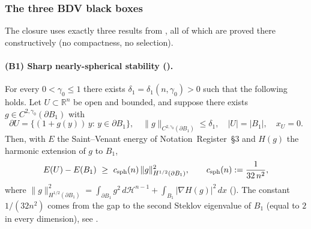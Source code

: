 \subsubsection{The three BDV black boxes}
\label{sec:plan1-bdv-blackboxes}

The closure uses exactly three results from
\cite{BDV}, all of which are proved there constructively (no
compactness, no selection).

\paragraph{(B1) Sharp nearly-spherical stability \textnormal{(\cite[Theorem~3.3]{BDV})}.}
For every $0<\gamma_{0}\le 1$ there exists
$\delta_{1}=\delta_{1}(n,\gamma_{0})>0$ such that the following holds.
Let $U\subset\mathbb{R}^{n}$ be open and bounded, and suppose there
exists $g\in C^{2,\gamma_{0}}(\partial B_{1})$ with
\begin{equation}\label{eq:plan1-ns-hyp}
   \partial U=\bigl\{(1+g(y))\,y:\,y\in\partial B_{1}\bigr\},
   \quad
   \|g\|_{C^{2,\gamma_{0}}(\partial B_{1})}\le\delta_{1},
   \quad
   |U|=|B_{1}|,
   \quad
   x_{U}=0.
\end{equation}
Then, with $E$ the Saint--Venant energy of
Notation~Register~\S3 and $H(g)$ the harmonic extension of $g$ to
$B_{1}$,
\begin{equation}\label{eq:plan1-BDV33}
   E(U)-E(B_{1})\ \ge\
   c_{\rm sph}(n)\,\|g\|_{H^{1/2}(\partial B_{1})}^{2},
   \qquad
   c_{\rm sph}(n):=\frac{1}{32\,n^{2}},
\end{equation}
where $\|g\|_{H^{1/2}(\partial B_{1})}^{2}=\int_{\partial B_{1}}g^{2}\,d\mathcal{H}^{n-1}+\int_{B_{1}}|\nabla H(g)|^{2}\,dx$
(\cite[Definition~3.2]{BDV}). The constant $1/(32n^{2})$ comes from
the gap to the second Steklov eigenvalue of $B_{1}$ (equal to $2$ in
every dimension), see \cite[(3.9)--(3.10)]{BDV}.

